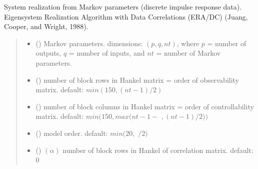 \documentclass[letterpaper,10pt,english]{sphinxmanual}
\begin{document}

\begin{fulllineitems}
\label{\detokenize{library/mdof.realize:mdof.realize.era_dc}}
\pysigstartsignatures
{}
\pysigstopsignatures
\sphinxAtStartPar
System realization from Markov parameters (discrete impulse response data).
Eigensystem Realization Algorithm with Data Correlations (ERA/DC) (Juang, Cooper, and Wright, 1988).
\begin{quote}\begin{description}
\begin{itemize}
\item {} 
\sphinxAtStartPar
{} () \textendash{} Markov parameters. dimensions: \((p,q,nt)\), where \(p\) = number of outputs,
\(q\) = number of inputs, and \(nt\) = number of Markov parameters.

\item {} 
\sphinxAtStartPar
{} (\sphinxstyleliteralemphasis{\sphinxupquote{, }}) \textendash{} number of block rows in Hankel matrix = order of observability matrix.
default: \(min(150, (nt-1)/2)\)

\item {} 
\sphinxAtStartPar
{} (\sphinxstyleliteralemphasis{\sphinxupquote{, }}) \textendash{} number of block columns in Hankel matrix = order of controllability matrix.
default: \(min(150, max(nt-1-\) \(, (nt-1)/2))\)

\item {} 
\sphinxAtStartPar
{} (\sphinxstyleliteralemphasis{\sphinxupquote{, }}) \textendash{} model order. default: \(min(20,\) \(/2)\)

\item {} 
\sphinxAtStartPar
{} (\sphinxstyleliteralemphasis{\sphinxupquote{, }}) \textendash{} \((\alpha)\) number of block rows in Hankel of correlation matrix. default: 0


\end{itemize}
\end{description}
\end{quote}
\end{fulllineitems}
\end{document}
